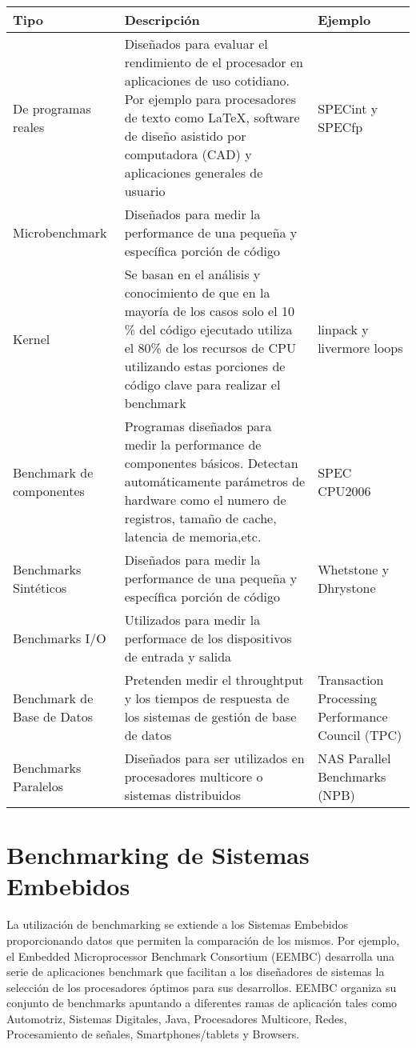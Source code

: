 \begin{tabular}{ p{2.5cm} p{8cm} p{3cm} }
\hline 
\rowcolor[gray]{0.8} Tipo & Descripción & Ejemplo \\
\hline
De programas reales & Diseñados para evaluar el
rendimiento de el procesador en aplicaciones de uso
cotidiano. Por ejemplo para procesadores de texto como \LaTeX, software
de diseño asistido por computadora (CAD) y
aplicaciones generales de usuario & SPECint y SPECfp\\
\hline
Microbenchmark & Diseñados para medir la performance
de una pequeña y específica porción de código \\
\hline
Kernel & Se basan en el análisis y conocimiento de
que en la mayoría de los casos solo el 10 \% del
código ejecutado utiliza el 80\% de los recursos de
CPU utilizando estas porciones de código clave para
realizar el benchmark~\cite{EtiquetaBM01} & linpack y
livermore loops\\
\hline
Benchmark de componentes & Programas diseñados para
medir la performance de componentes básicos. Detectan
automáticamente parámetros de hardware como el numero
de registros, tamaño de cache, latencia de
memoria,etc. & SPEC CPU2006\\
\hline
Benchmarks Sintéticos & Diseñados para medir la
performance de una pequeña y específica porción de
código & Whetstone y Dhrystone\\
\hline
Benchmarks I/O & Utilizados para medir la performace
de los dispositivos de entrada y salida & \\
\hline
Benchmark de Base de Datos & Pretenden medir el
throughtput y los tiempos de respuesta de los sistemas
de gestión de base de datos & Transaction Processing
Performance Council (TPC)\\
\hline
Benchmarks Paralelos & Diseñados para ser utilizados
en procesadores multicore o sistemas distribuidos &
NAS Parallel Benchmarks (NPB)\\
\hline
\end{tabular}
	
\section{Benchmarking de Sistemas Embebidos}

La utilización de benchmarking se extiende a los Sistemas Embebidos
proporcionando datos que permiten la comparación de los mismos. Por
ejemplo, el Embedded Microprocessor Benchmark Consortium (EEMBC)
desarrolla una serie de aplicaciones benchmark que facilitan a los
diseñadores de sistemas la selección de los procesadores óptimos para
sus desarrollos. EEMBC organiza su conjunto de benchmarks apuntando a
diferentes ramas de aplicación tales como Automotriz, Sistemas
Digitales, Java, Procesadores Multicore, Redes, Procesamiento de
señales, Smartphones/tablets y Browsers.
	
